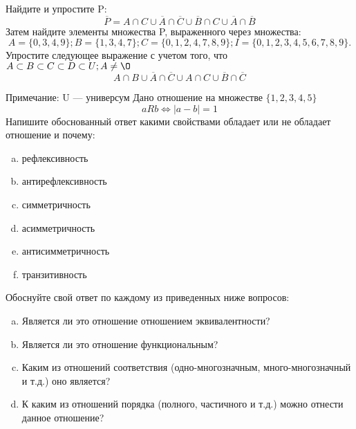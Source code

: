 \documentclass[10pt]{exam}
\begin{document}
\begin{questions}
\question
Найдите и упростите P:
\begin{equation*}
\overline{P} = A \cap C \cup \overline{A} \cap \overline{C} \cup \overline{B} \cap C \cup \overline{A} \cap \overline{B}
\end{equation*}
Затем найдите элементы множества P, выраженного через множества:
\begin{equation*}
A = \{0, 3, 4, 9\}; 
B = \{1, 3, 4, 7\};
C = \{0, 1, 2, 4, 7, 8, 9\};
I = \{0, 1, 2, 3, 4, 5, 6, 7, 8, 9\}.
\end{equation*}\question
Упростите следующее выражение с учетом того, что $A\subset B \subset C \subset D \subset U; A \neq \O$
\begin{equation*}
A \cap B \cup \overline{A} \cap \overline{C} \cup A \cap C \cup \overline{B} \cap \overline{C}
\end{equation*}

Примечание: U — универсум\question
Дано отношение на множестве $\{1, 2, 3, 4, 5\}$ 
\begin{equation*}
aRb \iff |a-b| = 1
\end{equation*}
Напишите обоснованный ответ какими свойствами обладает или не обладает отношение и почему:   
\begin{enumerate} [a)]\setcounter{enumi}{0}
\item рефлексивность
\item антирефлексивность
\item симметричность
\item асимметричность
\item антисимметричность
\item транзитивность
\end{enumerate}

Обоснуйте свой ответ по каждому из приведенных ниже вопросов:
\begin{enumerate} [a)]\setcounter{enumi}{0}
    \item Является ли это отношение отношением эквивалентности?
    \item Является ли это отношение функциональным?
    \item Каким из отношений соответствия (одно-многозначным, много-многозначный и т.д.) оно является?
    \item К каким из отношений порядка (полного, частичного и т.д.) можно отнести данное отношение?
\end{enumerate}


\end{questions}
\end{document}
